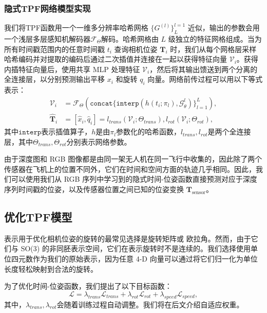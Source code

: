 \subsubsection{隐式TPF网络模型实现}

我们将TPF函数用一个一维多分辨率哈希网格 $\{G^{(l)}\}_L^{l=1}$ 近似，输出的参数会用一个浅层多层感知机解码器$\mathcal{F}_\Theta$解码。哈希网格由 $L$ 级独立的特征网格组成。当为所有时间戳范围内的任意时间戳 $t_i$ 查询相机位姿 $\mathbf{T}_i$ 时，我们从每个网格层采样哈希编码并对提取的编码后通过二次插值并连接在一起以获得特征向量 $\mathcal{V}_i$。获得内插特征向量后，使用共享 MLP 处理特征 $\mathcal{V}_i$，然后将其输出馈送到两个分离的全连接层，以分别预测输出平移 $x_i$ 和旋转 $q_i$ 向量。网络前传过程可以用以下等式表示：
\begin{align}
    \mathcal{V}_i&=\mathcal{F}_\Theta(\mathtt{concat}\{\mathtt{interp}(h(t_i;\pi_l), \mathcal{G}_\theta^l)\}^L_{l=1}),\\
    \hat{\mathbf{T}}_i &= [\hat{x}_i, \hat{q}_i] = l_{trans}(\mathcal{V}_i; \Theta_{trans}), l_{rot}(\mathcal{V}_i; \Theta_{rot}),
\end{align}
其中$\mathtt{interp}$表示插值算子，$h$是由$π_l$参数化的哈希函数，$l_{trans},l_{rot}$是两个全连接层，其中$\Theta_{trans},\Theta_{rot}$分别表示网络参数。

由于深度图和 RGB 图像都是由同一架无人机在同一飞行中收集的，因此除了两个传感器在飞机上的位置不同外，它们在时间和空间方面的轨迹几乎相同。因此，我们可以使用我们从 RGB 序列中学习到的隐式时间-位姿函数直接预测对应于深度序列时间戳的位姿，以及传感器位置之间已知的位姿变换 $\mathbf{T}_\text{sensor}$。


\subsection{优化TPF模型}
表示用于优化相机位姿的旋转的最常见选择是旋转矩阵\cite{yen-chen_inerf_2021}或 欧拉角。然而，由于它们与 SO(3) 的非同胚表示空间，它们在表示旋转时不是连续的\cite{kendall_posenet_2015}。我们选择使用单位四元数作为我们的原始表示，因为任意 4-D 向量可以通过将它们归一化为单位长度轻松映射到合法的旋转。

为了优化时间-位姿函数，我们提出了以下目标函数：
\begin{equation}
    \mathcal{L} = \lambda_{trans}\mathcal{L}_{trans}+\lambda_{rot}\mathcal{L}_{rot}+\lambda_{speed}\mathcal{L}_{speed},
\end{equation}
其中，$\lambda_{trans}, \lambda_{rot}$会随着训练过程自动调整。我们将在后文介绍自适应权重。

